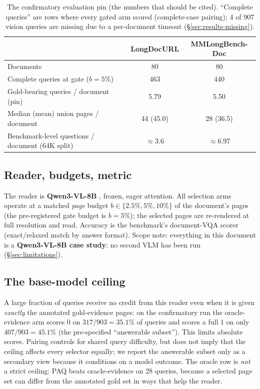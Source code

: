 \documentclass[11pt,letterpaper]{article}
\newcommand{\paq}{\textsc{PAQ}}
\begin{document}
\begin{table}[t]
\centering\small
\caption{The confirmatory evaluation pin (the numbers that should be cited). ``Complete queries''
are rows where every gated arm scored (complete-case pairing); 4 of 907 vision queries are missing
due to a per-document timeout (\S\ref{sec:results-missing}).}
\label{tab:pins}
\begin{tabular}{lcc}
\toprule
 & LongDocURL & MMLongBench-Doc \\
\midrule
Documents & 80 & 80 \\
Complete queries at gate ($b{=}5\%$) & 463 & 440 \\
Gold-bearing queries / document (pin) & 5.79 & 5.50 \\
Median (mean) union pages / document & 44 (45.0) & 28 (36.5) \\
Benchmark-level questions / document (64K split) & $\approx 3.6$ & $\approx 6.97$ \\
\bottomrule
\end{tabular}
\end{table}

\subsection{Reader, budgets, metric}
The reader is \textbf{Qwen3-VL-8B} \citep{qwen3vl2025}, frozen, eager attention. All selection
arms operate at a matched \emph{page} budget $b \in \{2.5\%, 5\%, 10\%\}$ of the document's pages
(the pre-registered gate budget is $b=5\%$); the selected pages are re-rendered at full resolution
and read. Accuracy is the benchmark's document-VQA scorer (exact/relaxed match by answer format).
Scope note: everything in this document is a \textbf{Qwen3-VL-8B case study}; no second VLM has
been run (\S\ref{sec:limitations}).

\subsection{The base-model ceiling}
A large fraction of queries receive no credit from this reader even when it is given
\emph{exactly} the annotated gold-evidence pages: on the confirmatory run the oracle-evidence arm
scores $0$ on
$317/903 = 35.1\%$ of queries and scores a full $1$ on only $407/903 = 45.1\%$ (the pre-specified
``answerable subset''). This limits absolute scores. Pairing controls for shared query difficulty,
but does not imply that the ceiling affects every selector equally; we report the answerable
subset only as a secondary view because it conditions on a model outcome. The oracle row is
\emph{not} a strict ceiling: \paq{} beats oracle-evidence on 28 queries, because a selected page
set can differ from the annotated gold set in ways that help the reader.
\end{document}
